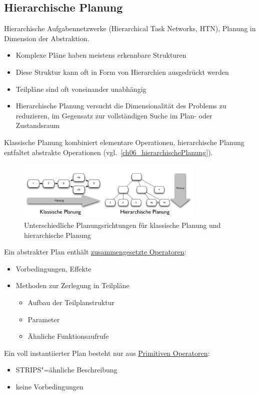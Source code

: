 \subsection{Hierarchische Planung}
Hierarchische Aufgabennetzwerke (Hierarchical Task Networks, HTN), Planung in Dimension der Abstraktion.
\begin{itemize}
	\item Komplexe Pläne haben meistens erkennbare Strukturen
	\item Diese Struktur kann oft in Form von Hierarchien ausgedrückt werden
	\item Teilpläne sind oft voneinander unabhängig
	\item Hierarchische Planung versucht die Dimensionalität des Problems zu reduzieren, im Gegensatz zur vollständigen Suche im Plan- oder Zustandsraum
\end{itemize}

Klassische Planung kombiniert elementare Operationen, hierarchische Planung entfaltet abstrakte Operationen (vgl.\ \autoref{ch06_hierarchischePlanung}).

\begin{figure}[ht]\centering 
\includegraphics[width=0.8\textwidth]{figures/ch06_hierarchischePlanung.png}
\caption{Unterschiedliche Planungsrichtungen für klassische Planung und hierarchische Planung}
\label{ch06_hierarchischePlanung}
\end{figure}

Ein abstrakter Plan enthält \underline{zusammengesetzte Operatoren}:
\begin{itemize}
	\item Vorbedingungen, Effekte
	\item Methoden zur Zerlegung in Teilpläne
	\begin{itemize}
		\item Aufbau der Teilplanstruktur
		\item Parameter
		\item Ähnliche Funktionsaufrufe
	\end{itemize}
\end{itemize}
Ein voll instantiierter Plan besteht nur aus \underline{Primitiven Operatoren}:
\begin{itemize}
	\item STRIPS"=ähnliche Beschreibung
	\item keine Vorbedingungen
\end{itemize}

